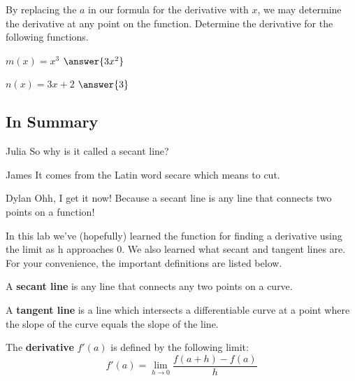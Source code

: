 \documentclass{ximera}
\begin{document}
By replacing the $a$ in our formula for the derivative with $x$, we may determine the derivative at any point on the function. Determine the derivative for the following functions.
\begin{question}
$m(x) = x^3$ $\answer{3x^2}$
\end{question}
\begin{question}
$n(x) = 3x+2$ $\answer{3}$
\end{question}


\subsection{In Summary}
\begin{dialogue}
\item[Julia] So why is it called a secant line?
\item[James] It comes from the Latin word secare which means to cut.
\item[Dylan] Ohh, I get it now! Because a secant line is any line that connects two points on a function!
\end{dialogue}
In this lab we've (hopefully) learned the function for finding a derivative using the limit as h approaches 0. We also learned what secant and tangent lines are. For your convenience, the important definitions are listed below. 
\begin{definition}
 A \textbf{secant line} is any line that connects any two points on a curve.
\end{definition}
\begin{definition}
A \textbf{tangent line} is a line which intersects a differentiable curve at a point where the slope of the curve equals the slope of the line.
\end{definition}
\begin{definition}
The \textbf{derivative} $f'(a)$ is defined by the following limit:
$$f'(a)=\displaystyle \lim_{h\rightarrow 0} \frac{f(a+h)-f(a)}{h}$$
\end{definition}
\end{document}
